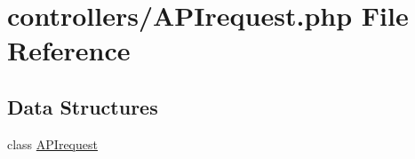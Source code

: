 \hypertarget{_a_p_irequest_8php}{}\section{controllers/\+A\+P\+Irequest.php File Reference}
\label{_a_p_irequest_8php}
\subsection*{Data Structures}
\begin{DoxyCompactItemize}
\item 
class \mbox{\hyperlink{class_a_p_irequest}{A\+P\+Irequest}}
\end{DoxyCompactItemize}
